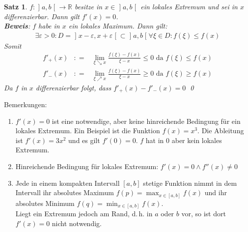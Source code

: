 \documentclass[ngerman,titlepage,twoside, parskip=half*]{scrreprt}
\newcommand*{\R}{\mathbb{R}}
\theoremstyle{plain}
\newtheorem{theorem}{Satz}[section]
\theoremstyle{definition}
\theoremstyle{remark}
\newcommand*{\coloneqq}{\mathrel{\mathop:}=}
\newcommand*{\bsofint}[1]{\mathopen{]}#1\mathclose{[}} %
\begin{document}
\begin{theorem}
  \label{satz:lokExtremum}
  $f\colon\bsofint{a,b}\rightarrow\R$ besitze in $x\in \bsofint{a,b}$ ein lokales Extremum
  und sei in $x$ differenzierbar. Dann gilt $f'(x)=0$.\\
  \textbf{Beweis}: $f$ habe in $x$ ein lokales Maximum. Dann gilt:
  \begin{gather*}\exists\varepsilon>0\colon D=\bsofint{x-\varepsilon,x+\varepsilon}\subset\bsofint{a,b}
  \forall\xi\in D\colon f(\xi)\leq f(x)\end{gather*}
  Somit
  \begin{align*}
    f'_+(x) & \coloneqq & \lim_{\xi\searrow x}\frac{f(\xi)-f(x)}{\xi-x}\leq 0 \text{ da } f(\xi)\leq f(x)\\
    f'_-(x) & \coloneqq & \lim_{\xi\nearrow x}\frac{f(\xi)-f(x)}{\xi-x}\geq 0 \text{ da } f(\xi)\geq f(x)
  \end{align*}
  Da $f$ in $x$ differenzierbar folgt, dass $f'_+(x)-f'_-(x)=0$
  \qed
\end{theorem}

Bemerkungen:
\begin{enumerate}[(1)]
  \item $f'(x)=0$ ist eine notwendige, aber keine hinreichende 
    Bedingung für ein lokales Extremum. Ein Beispiel ist die Funktion
    $f(x)=x^3$. Die Ableitung ist $f'(x)=3x^2$ und es gilt $f'(0)=0$.
    $f$ hat in 0 aber kein lokales Extremum.
  \item Hinreichende Bedingung für lokales Extremum: $f'(x)=0\wedge f''(x)\neq 0$
  \item Jede in einem kompakten Intervall $[a,b]$ stetige Funktion nimmt
    in dem Intervall ihr absolutes Maximum $f(p)=\max_{x\in[a,b]}f(x)$
    und ihr absolutes Minimum $f(q)=\min_{x\in[a,b]}f(x)$.\\
    Liegt ein Extremum jedoch am Rand, d.\,h. in $a$ oder $b$ vor, so ist
    dort $f'(x)=0$ nicht notwendig.
\end{enumerate}
\end{document}

